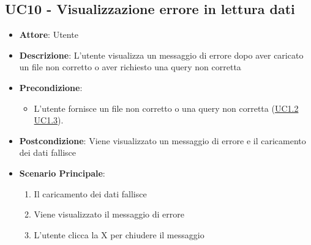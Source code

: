 \subsection{UC10 - Visualizzazione errore in lettura dati}
    \label{uc10}
    \begin{itemize}
    \item \textbf{Attore}: Utente
    \item \textbf{Descrizione}: L’utente visualizza un messaggio di errore dopo aver caricato un file non corretto o aver richiesto una query non corretta
    \item \textbf{Precondizione}: 
    \begin{itemize}
        \item L'utente fornisce un file non corretto o una query non corretta (\hyperref[uc1.2]{UC1.2} \hyperref[uc1.3]{UC1.3}).
    \end{itemize}  
    \item \textbf{Postcondizione}: Viene visualizzato un messaggio di errore e il caricamento dei dati fallisce
    \item \textbf{Scenario Principale}: 
    \begin{enumerate}
        \item Il caricamento dei dati fallisce
        \item Viene visualizzato il messaggio di errore
        \item L'utente clicca la X per chiudere il messaggio
    \end{enumerate}
    \end{itemize}